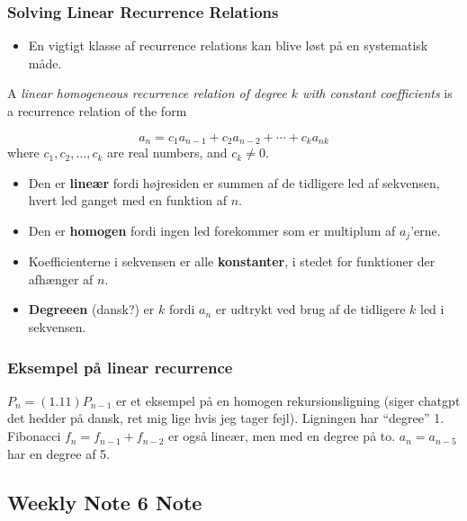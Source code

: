 \documentclass{beamer}
\begin{document}
\begin{frame}[allowframebreaks]
  \frametitle{Solving Linear Recurrence Relations}
  \begin{itemize}
  \item En vigtigt klasse af recurrence relations kan blive løst på en systematisk måde. 
  \end{itemize}
  \begin{definition}
    A \textit{linear homogeneous recurrence relation of degree $k$ with constant coefficients} is a recurrence relation of the form

    \[ a_{n} = c_{1}a_{n-1} + c_{2}a_{n-2} + \cdots + c_{k}a_{nk} \]
    where $c_{1}, c_{2}, \ldots, c_{k}$ are real numbers, and $c_{k} \neq 0$.
  \end{definition}
  \begin{itemize}
  \item Den er \textbf{lineær} fordi højresiden er summen af de tidligere led af sekvensen, hvert led ganget med en funktion af $n$. 
  \item Den er \textbf{homogen} fordi ingen led forekommer som er multiplum af $a_{j}$'erne. 
  \item Koefficienterne i sekvensen er alle \textbf{konstanter}, i stedet for funktioner der afhænger af $n$.
  \item \textbf{Degreeen} (dansk?) er $k$ fordi $a_{n}$ er udtrykt ved brug af de tidligere $k$  led i sekvensen. 
  \end{itemize}
\end{frame}

\begin{frame}
  \frametitle{Eksempel på linear recurrence}
  $P_{n} = (1.11)P_{n-1}$ er et eksempel på en homogen rekursionsligning (siger chatgpt det hedder på dansk, ret mig lige hvis jeg tager fejl). Ligningen har ``degree'' 1.
  Fibonacci $f_{n} = f_{n-1} + f_{n-2}$ er også lineær, men med en degree på to.
  $a_{n} = a_{n-5}$ har en degree af 5.
\end{frame}

\subsection{Weekly Note 6 Note}
\label{subsec:week6}
\end{document}

